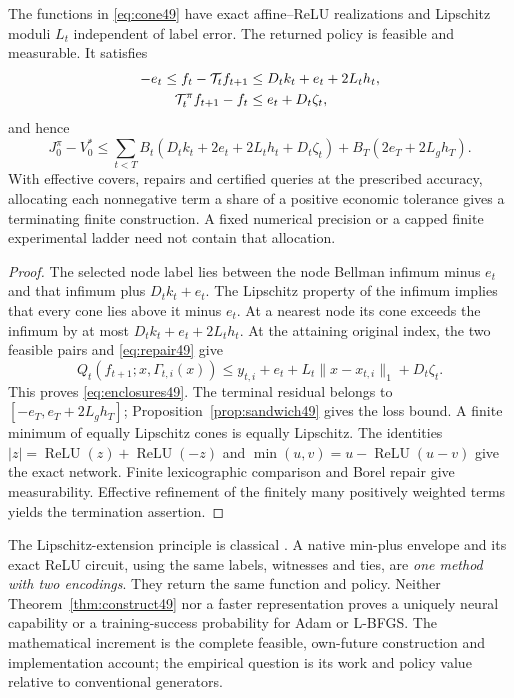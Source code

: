 \begin{theorem}\label{thm:construct49}
The functions in \eqref{eq:cone49} have exact affine--ReLU realizations and Lipschitz moduli $L_t$ independent of label error. The returned policy is feasible and measurable. It satisfies
\begin{align}\label{eq:enclosures49}
 -e_t\le f_t-\mathcal T_tf_{t+1}&\le D_tk_t+e_t+2L_th_t,\\
 \mathcal T_t^\pi f_{t+1}-f_t&\le e_t+D_t\zeta_t,\notag
\end{align}
and hence
\begin{equation}\label{eq:constructionloss49}
 J_0^\pi-V_0^*\le
 \sum_{t<T}B_t(D_tk_t+2e_t+2L_th_t+D_t\zeta_t)
 +B_T(2e_T+2L_gh_T).
\end{equation}
With effective covers, repairs and certified queries at the prescribed accuracy, allocating each nonnegative term a share of a positive economic tolerance gives a terminating finite construction. A fixed numerical precision or a capped finite experimental ladder need not contain that allocation.
\end{theorem}
\begin{proof}
The selected node label lies between the node Bellman infimum minus $e_t$ and that infimum plus $D_tk_t+e_t$. The Lipschitz property of the infimum implies that every cone lies above it minus $e_t$. At a nearest node its cone exceeds the infimum by at most $D_tk_t+e_t+2L_th_t$. At the attaining original index, the two feasible pairs and \eqref{eq:repair49} give
\[
 Q_t(f_{t+1};x,\Gamma_{t,i}(x))
 \le y_{t,i}+e_t+L_t\|x-x_{t,i}\|_1+D_t\zeta_t.
\]
This proves \eqref{eq:enclosures49}. The terminal residual belongs to $[-e_T,e_T+2L_gh_T]$; Proposition~\ref{prop:sandwich49} gives the loss bound. A finite minimum of equally Lipschitz cones is equally Lipschitz. The identities $|z|=\operatorname{ReLU}(z)+\operatorname{ReLU}(-z)$ and $\min(u,v)=u-\operatorname{ReLU}(u-v)$ give the exact network. Finite lexicographic comparison and Borel repair give measurability. Effective refinement of the finitely many positively weighted terms yields the termination assertion.
\end{proof}

The Lipschitz-extension principle is classical \citep{mcshane1934}. A native min-plus envelope and its exact ReLU circuit, using the same labels, witnesses and ties, are \emph{one method with two encodings}. They return the same function and policy. Neither Theorem~\ref{thm:construct49} nor a faster representation proves a uniquely neural capability or a training-success probability for Adam or L-BFGS. The mathematical increment is the complete feasible, own-future construction and implementation account; the empirical question is its work and policy value relative to conventional generators.

